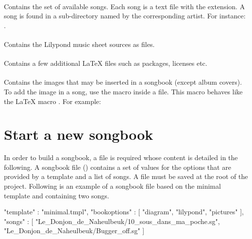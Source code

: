 \paragraph{}
Contains the set of available songs. Each song is a text file with the
 extension. A song is found in a sub-directory named by the
corresponding artist. For instance:
.

\paragraph{}
Contains the Lilypond music sheet sources as  files.

\paragraph{}
Contains a few additional \LaTeX{} files such as packages, licenses etc.

\paragraph{}
Contains the images that may be inserted in a songbook (except album
covers). To add the image  in a song, use the
 macro inside a  file. This macro behaves like
the \LaTeX{} macro . For example:

\begin{songbook}
\end{songbook}

\section{Start a new songbook}
\label{sec:create-songbook}

In order to build a songbook, a  file is required whose
content is detailed in the following. A songbook file ()
contains a set of values for the options that are provided by a
template and a list of songs.  A  file must be saved at the
root of the project. Following is an example of a songbook file based
on the minimal template and containing two songs.

\begin{code}
{
"template" : "minimal.tmpl",
"bookoptions" : [
    "diagram",
    "lilypond",
    "pictures"
  ],
"songs" : [
    "Le_Donjon_de_Naheulbeuk/10_sous_dans_ma_poche.sg",
    "Le_Donjon_de_Naheulbeuk/Bugger_off.sg"
  ]
}
\end{code}

